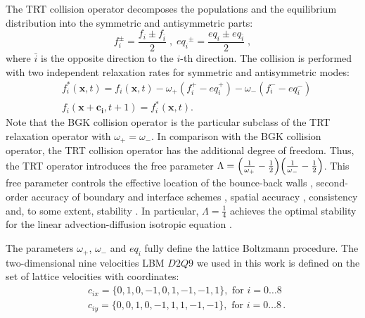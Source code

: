 \documentclass{article}
\newcommand{\beqal}{\begin{equation}\begin{aligned}}
\newcommand{\feqal}{\end{aligned}\end{equation}}
\newcommand{\omegaplus}{\omega_{+}}
\newcommand{\omegaminus}{\omega_{-}}
\begin{document}
The TRT collision operator \cite{ginzburg-boundary-main}
decomposes the populations and the equilibrium
distribution into the symmetric and antisymmetric parts:
\begin{equation}
\label{trtdecomp}
f^{\pm}_i=\frac{f_i\pm f_{\bar{i}}}{2}\;,\; 
{eq_i}^{\pm}=\frac{eq_i\pm eq_{\bar{i}}}{2}\;,
\end{equation}
where $\bar{i}$ is the opposite direction to the $i$-th direction.
The collision is performed with two independent relaxation rates for 
symmetric and antisymmetric modes:
\begin{equation}
\label{trt}
\begin{aligned}
&f_i^{*}(\bm{x},t)=f_i(\bm{x},t)-\omegaplus (f_i^{+} - eq_i^+)-\omegaminus
(f_i^{-} -
eq_i^-)\\
&f_i(\bm{x}+\bm{c_i},t+1)=f_i^{*}(\bm{x},t).
\end{aligned}
\end{equation}
Note that the BGK collision operator is the particular subclass of the TRT relaxation operator with
$\omegaplus=\omegaminus$. In comparison with the BGK collision operator,
the TRT collision operator has the additional degree of freedom. Thus, the TRT operator 
introduces
the free parameter
$\Lambda=\Bigl(\frac{1}{\omegaplus}-\frac{1}{2}\Bigr)\Bigl(\frac{1}{\omegaminus}-\frac{1}{2}
\Bigr)$. 
This free parameter controls the effective location of the bounce-back
walls \cite{ginzburg-multireflection}, second-order accuracy of
boundary \cite{ginzburg-boundary-main} and interface schemes \cite{ginzburg-discontinious}, 
spatial accuracy \cite{ginzburg-recurrence,servan-trt-stability},
consistency \cite{ginzburg-brinkman} and, to some extent,
stability \cite{kuzmin-stability-optimal,kuzmin-d1q3,servan-trt-stability}.
In particular, $\Lambda=\frac{1}{4}$ achieves the optimal stability for the
linear advection-diffusion isotropic equation \cite{kuzmin-stability-optimal}. 

The parameters $\omegaplus$, $\omegaminus$ and $eq_i$ fully define the lattice Boltzmann
procedure. The two-dimensional nine velocities LBM $D2Q9$ we used in this work is defined on the set
of lattice
velocities with coordinates:
\beqal
&c_{ix}=\{0,1,0,-1,0,1,-1,-1,1\},\text{ for } i=0\dots8\\
&c_{iy}=\{0,0,1,0,-1,1,1,-1,-1\},\text{ for } i=0\dots8\,.
\feqal
\end{document}
